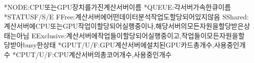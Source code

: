 \documentclass[a4paper,11pt,english]{sphinxmanual}
\begin{document}
\begin{sphinxVerbatim}[commandchars=\\\{\}]
*NODE:CPU또는GPU장치를가진계산서버이름
*QUEUE:각서버가속한큐이름
*STATUSF/S/E
\PYGZhy{}FFree:계산서버에어떤데이터분석작업도할당되어있지않음
\PYGZhy{}SShared:계산서버에CPU또는GPU작업이할당되어실행중이나,해당서버의모든자원을할당받은상태는아님
\PYGZhy{}EExclusive:계산서버에작업들이할당되어실행중이고,작업들이모든자원을할당받아busy한상태
*\PYG{o}{[}GPU\PYG{o}{]}T/U/F:GPU계산서버에설치된GPU카드총개수,사용중인개수
*\PYG{o}{[}CPU\PYG{o}{]}T/U/F:CPU계산서버의총코어개수,사용중인개수
\end{sphinxVerbatim}
\end{document}
